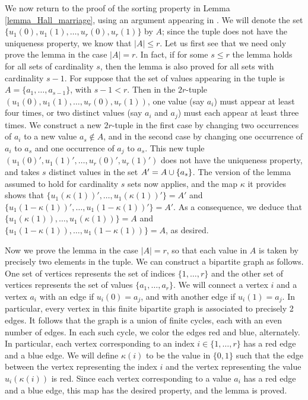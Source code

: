 \documentclass[oneside,11pt]{amsart}
\begin{document}
We now return to the proof of the sorting property in Lemma \ref{lemma_Hall_marriage}, using an argument appearing in \cite[Lemma 2.22]{MSZK18x}. 
We will denote the set $\{ u_1(0), u_1(1), \ldots, u_r(0), u_r(1) \}$ by $A$; since the tuple does not have the uniqueness property, we know that $|A| \leq r$. Let us first see that we need only prove the lemma in the case $|A|=r$. In fact, if for some $s \leq r$  the lemma holds for all sets of cardinality $s$, then the lemma is also proved for all sets with cardinality $s-1$. For suppose that the set of values appearing in the tuple is $A=\{a_1,\ldots, a_{s-1}\}$, with $s-1<r$. Then in the $2r$-tuple $(u_1(0), u_1(1), \ldots, u_r(0), u_r(1))$, one value (say $a_i$) must appear at least four times, or two distinct values (say $a_i$ and $a_j$) must each appear at least three times. We construct a new $2r$-tuple in the first case by changing two occurrences of $a_i$ to a new value $a_s \not\in A$, and in the second case by changing one occurrence of $a_i$ to $a_s$ and one occurrence of $a_j$ to $a_s$. This new tuple $(u_1(0)', u_1(1)', \ldots, u_r(0)', u_r(1)')$ does not have the uniqueness property, and takes $s$ distinct values in the set $A' = A \cup \{a_s\}$. The version of the lemma assumed to hold for cardinality $s$ sets now applies, and the map $\kappa$ it provides shows that 
$\{u_1(\kappa(1))',\ldots, u_1(\kappa(1))'\}= A'$ and $\{u_1(1-\kappa(1))',\ldots, u_1(1-\kappa(1))'\} = A'$.
As a consequence, we deduce that
$\{u_1(\kappa(1)),\ldots, u_1(\kappa(1))\} = A$ and $\{u_1(1-\kappa(1)),\ldots, u_1(1-\kappa(1))\} = A$, as desired. 

Now we prove the lemma in the case $|A|=r$, so that each value in $A$ is taken by precisely two elements in the tuple. We can construct a bipartite graph as follows. One set of vertices represents the set of indices $\{1,\ldots, r\}$ and the other set of vertices represents the set of values $\{a_1,\ldots, a_r\}$. We will connect a vertex $i$ and a vertex $a_i$ with an edge if $u_i(0) =a_j$, and with another edge  if $u_i(1) = a_j$. In particular, every vertex in this finite bipartite graph is associated to precisely 2 edges. It follows that the graph is a union of finite cycles, each with an even number of edges. 
In each such cycle, we color the edges red and blue, alternately. In particular, each vertex corresponding to an index $i \in \{1,\ldots, r\}$ has a red edge and a blue edge. We will define $\kappa(i)$ to be the value in $\{0,1\}$ such that the edge between the vertex representing the index $i$ and the vertex representing the value $u_i(\kappa(i))$ is red. Since each vertex corresponding to a value $a_i$ has a red edge and a blue edge, this map has the desired property, and the lemma is proved.
\end{document}
